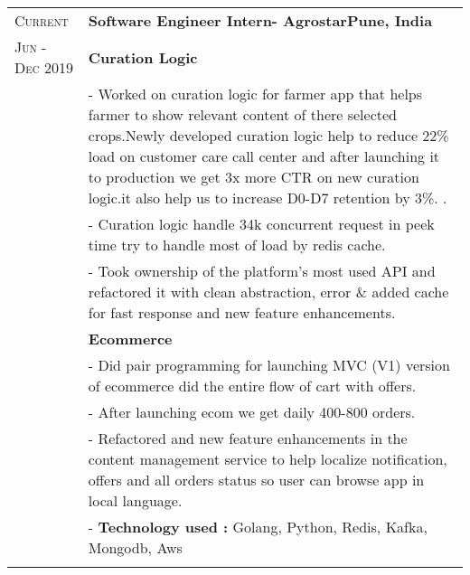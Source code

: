 \documentclass[a4paper,10pt]{extarticle} %
\begin{document}
\begin{tabularx}{\linewidth}{ l | X }

\textsc{Current} & \textbf{Software Engineer Intern- Agrostar}\hfill\textbf{Pune, India}\\
\textsc{Jun - Dec 2019}
& \textbf{Curation Logic}\\
& {- Worked on curation logic for farmer app that helps farmer to show relevant content of there selected crops.Newly developed curation logic help to reduce 22\% load on customer care call center and after launching it to production we get 3x more CTR on new curation logic.it also help us to increase D0-D7 retention by 3\%.
.}\\
& {- Curation logic handle 34k concurrent request in peek time try to handle most of  load by redis cache.}\\
& {- Took ownership of the platform's most used API and refactored it with clean abstraction, error \& added cache for fast response and new feature enhancements.}\\

& \textbf{Ecommerce}\\
& {- Did pair programming for launching MVC (V1) version of ecommerce did the entire flow of cart with offers.}\\
& {- After launching ecom we get daily 400-800 orders.}\\
&{- Refactored and new feature enhancements in the content management service to help localize notification, offers and all orders status so user can browse app in local language.}\\
&{- \textbf{Technology used :} Golang, Python, Redis, Kafka, Mongodb, Aws}\\
\multicolumn{2}{c}{} \\

\end{tabularx}


\end{document}
